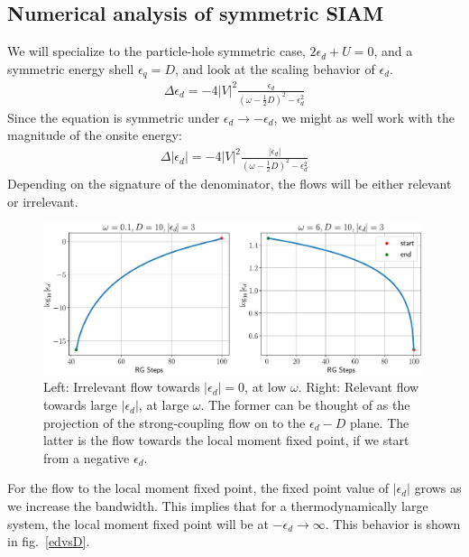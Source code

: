 \documentclass[twoside,11pt]{report}
\numberwithin{equation}{section}
\begin{document}
\subsection{Numerical analysis of symmetric SIAM}
We will specialize to the particle-hole symmetric case, \(2\epsilon_d + U = 0\), and a symmetric energy shell \(\epsilon_q = D\), and look at the scaling behavior of \(\epsilon_d\).
\begin{equation}\begin{aligned}
	\Delta \epsilon_d = -4|V|^2 \frac{\epsilon_d}{\left( \omega - \frac{1}{2}D \right)^2 - \epsilon_d^2}
\end{aligned}\end{equation}
Since the equation is symmetric under \(\epsilon_d \to -\epsilon_d\), we might as well work with the magnitude of the onsite energy:
\begin{equation}\begin{aligned}
	\Delta |\epsilon_d| = -4|V|^2 \frac{|\epsilon_d|}{\left( \omega - \frac{1}{2}D \right)^2 - \epsilon_d^2}
\end{aligned}\end{equation}
Depending on the signature of the denominator, the flows will be either relevant or irrelevant.
\begin{figure}[htpb]
	\centering
	\includegraphics[width=0.99\textwidth]{../figures/ed_pure_siam.pdf}
	\caption{Left: Irrelevant flow towards \(|\epsilon_d|=0\), at low \(\omega\). Right: Relevant flow towards large \(|\epsilon_d|\), at large \(\omega\). The former can be thought of as the projection of the strong-coupling flow on to the \(\epsilon_d-D\) plane. The latter is the flow towards the local moment fixed point, if we start from a negative \(\epsilon_d\).}
\end{figure}
For the flow to the local moment fixed point, the fixed point value of \(|\epsilon_d|\) grows as we increase the bandwidth. This implies that for a thermodynamically large system, the local moment fixed point will be at \(-\epsilon_d \to \infty\). This behavior is shown in fig.~\ref{edvsD}.
\end{document}
